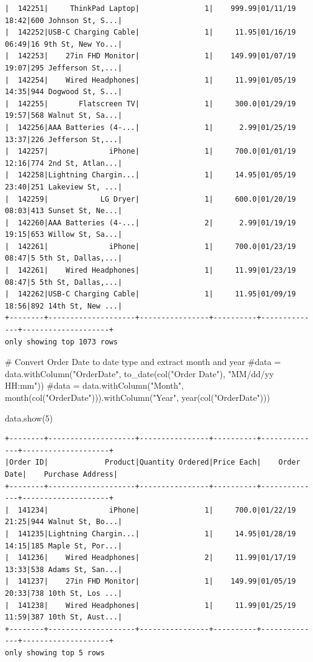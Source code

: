 \documentclass[
  letterpaper,
  DIV=11,
  numbers=noendperiod]{scrartcl}
\newenvironment{Shaded}{\begin{snugshade}}{\end{snugshade}}
\newcommand{\CommentTok}[1]{\textcolor[rgb]{0.37,0.37,0.37}{#1}}
\newcommand{\DecValTok}[1]{\textcolor[rgb]{0.68,0.00,0.00}{#1}}
\newcommand{\NormalTok}[1]{\textcolor[rgb]{0.00,0.23,0.31}{#1}}
\begin{document}
\begin{verbatim}
|  142251|     ThinkPad Laptop|               1|    999.99|01/11/19 18:42|600 Johnson St, S...|
|  142252|USB-C Charging Cable|               1|     11.95|01/16/19 06:49|16 9th St, New Yo...|
|  142253|    27in FHD Monitor|               1|    149.99|01/07/19 19:07|295 Jefferson St,...|
|  142254|    Wired Headphones|               1|     11.99|01/05/19 14:35|944 Dogwood St, S...|
|  142255|       Flatscreen TV|               1|     300.0|01/29/19 19:57|568 Walnut St, Sa...|
|  142256|AAA Batteries (4-...|               1|      2.99|01/25/19 13:37|226 Jefferson St,...|
|  142257|              iPhone|               1|     700.0|01/01/19 12:16|774 2nd St, Atlan...|
|  142258|Lightning Chargin...|               1|     14.95|01/05/19 23:40|251 Lakeview St, ...|
|  142259|            LG Dryer|               1|     600.0|01/20/19 08:03|413 Sunset St, Ne...|
|  142260|AAA Batteries (4-...|               2|      2.99|01/19/19 19:15|653 Willow St, Sa...|
|  142261|              iPhone|               1|     700.0|01/23/19 08:47|5 5th St, Dallas,...|
|  142261|    Wired Headphones|               1|     11.99|01/23/19 08:47|5 5th St, Dallas,...|
|  142262|USB-C Charging Cable|               1|     11.95|01/09/19 18:56|892 14th St, New ...|
+--------+--------------------+----------------+----------+--------------+--------------------+
only showing top 1073 rows
\end{verbatim}

\begin{Shaded}
\begin{Highlighting}[]
\CommentTok{\# Convert Order Date to date type and extract month and year}
\CommentTok{\#data = data.withColumn("OrderDate", to\_date(col("Order Date"), "MM/dd/yy HH:mm"))}
\CommentTok{\#data = data.withColumn("Month", month(col("OrderDate"))).withColumn("Year", year(col("OrderDate")))}

\NormalTok{data.show(}\DecValTok{5}\NormalTok{)}
\end{Highlighting}
\end{Shaded}

\begin{verbatim}
+--------+--------------------+----------------+----------+--------------+--------------------+
|Order ID|             Product|Quantity Ordered|Price Each|    Order Date|    Purchase Address|
+--------+--------------------+----------------+----------+--------------+--------------------+
|  141234|              iPhone|               1|     700.0|01/22/19 21:25|944 Walnut St, Bo...|
|  141235|Lightning Chargin...|               1|     14.95|01/28/19 14:15|185 Maple St, Por...|
|  141236|    Wired Headphones|               2|     11.99|01/17/19 13:33|538 Adams St, San...|
|  141237|    27in FHD Monitor|               1|    149.99|01/05/19 20:33|738 10th St, Los ...|
|  141238|    Wired Headphones|               1|     11.99|01/25/19 11:59|387 10th St, Aust...|
+--------+--------------------+----------------+----------+--------------+--------------------+
only showing top 5 rows
\end{verbatim}
\end{document}
